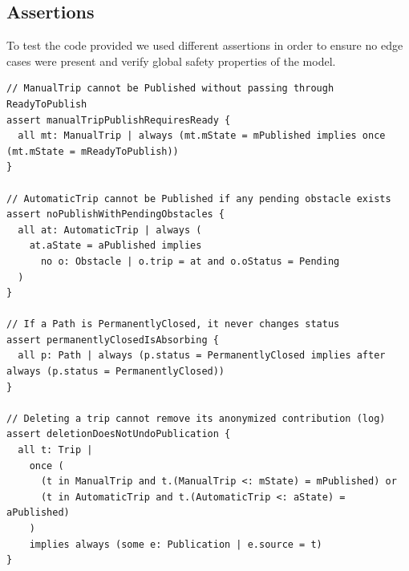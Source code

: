 \subsection{Assertions}
To test the code provided we used different assertions in order to ensure no edge
cases were present and verify global safety properties of the model.
\begin{lstlisting}[language=alloy]
// ManualTrip cannot be Published without passing through ReadyToPublish
assert manualTripPublishRequiresReady {
  all mt: ManualTrip | always (mt.mState = mPublished implies once (mt.mState = mReadyToPublish))
}

// AutomaticTrip cannot be Published if any pending obstacle exists
assert noPublishWithPendingObstacles {
  all at: AutomaticTrip | always (
    at.aState = aPublished implies
      no o: Obstacle | o.trip = at and o.oStatus = Pending
  )
}

// If a Path is PermanentlyClosed, it never changes status
assert permanentlyClosedIsAbsorbing {
  all p: Path | always (p.status = PermanentlyClosed implies after always (p.status = PermanentlyClosed))
}

// Deleting a trip cannot remove its anonymized contribution (log)
assert deletionDoesNotUndoPublication {
  all t: Trip |
    once (
      (t in ManualTrip and t.(ManualTrip <: mState) = mPublished) or
      (t in AutomaticTrip and t.(AutomaticTrip <: aState) = aPublished)
    )
    implies always (some e: Publication | e.source = t)
}

\end{lstlisting}